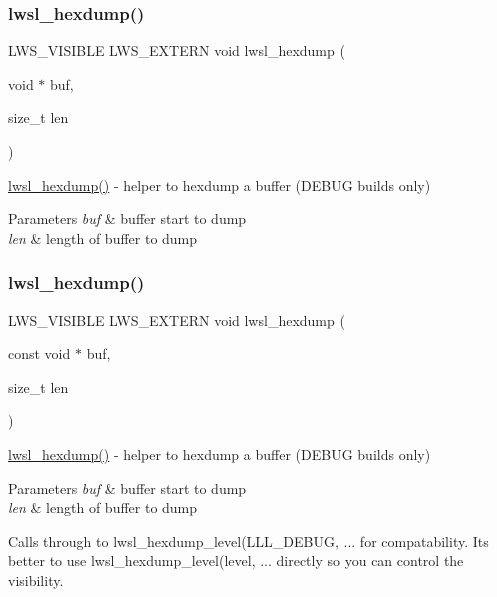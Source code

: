 \subsubsection{\texorpdfstring{lwsl\+\_\+hexdump()}{lwsl\_hexdump()}\hspace{0.1cm}{\footnotesize\ttfamily [1/2]}}
{\footnotesize\ttfamily L\+W\+S\+\_\+\+V\+I\+S\+I\+B\+LE L\+W\+S\+\_\+\+E\+X\+T\+E\+RN void lwsl\+\_\+hexdump (\begin{DoxyParamCaption}\item[{void $\ast$}]{buf,  }\item[{size\+\_\+t}]{len }\end{DoxyParamCaption})}

\hyperlink{group__log_ga3dbcc421d80599c337aaf1a2ba39ad3c}{lwsl\+\_\+hexdump()} -\/ helper to hexdump a buffer (D\+E\+B\+UG builds only)


\begin{DoxyParams}{Parameters}
{\em buf} & buffer start to dump \\
\hline
{\em len} & length of buffer to dump \\
\hline
\end{DoxyParams}
\mbox{\label{group__log_ga3dbcc421d80599c337aaf1a2ba39ad3c}} 
\subsubsection{\texorpdfstring{lwsl\+\_\+hexdump()}{lwsl\_hexdump()}\hspace{0.1cm}{\footnotesize\ttfamily [2/2]}}
{\footnotesize\ttfamily L\+W\+S\+\_\+\+V\+I\+S\+I\+B\+LE L\+W\+S\+\_\+\+E\+X\+T\+E\+RN void lwsl\+\_\+hexdump (\begin{DoxyParamCaption}\item[{const void $\ast$}]{buf,  }\item[{size\+\_\+t}]{len }\end{DoxyParamCaption})}

\hyperlink{group__log_ga3dbcc421d80599c337aaf1a2ba39ad3c}{lwsl\+\_\+hexdump()} -\/ helper to hexdump a buffer (D\+E\+B\+UG builds only)


\begin{DoxyParams}{Parameters}
{\em buf} & buffer start to dump \\
\hline
{\em len} & length of buffer to dump\\
\hline
\end{DoxyParams}
Calls through to lwsl\+\_\+hexdump\+\_\+level(L\+L\+L\+\_\+\+D\+E\+B\+UG, ... for compatability. It\textquotesingle{}s better to use lwsl\+\_\+hexdump\+\_\+level(level, ... directly so you can control the visibility. \mbox{\label{group__log_ga0981f080d7231c5ae0a8f7dfb51b1d0c}} 
